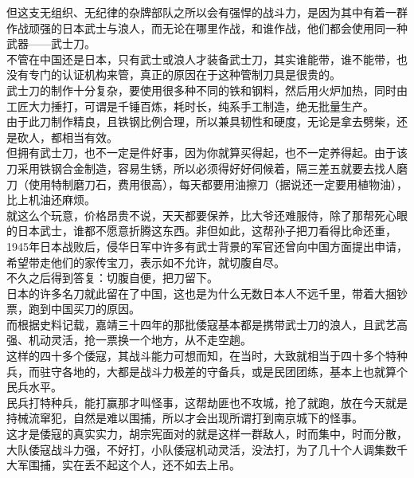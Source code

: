 \begin{multicols}{\theparacolNo}
但这支无组织、无纪律的杂牌部队之所以会有强悍的战斗力，是因为其中有着一群作战顽强的日本武士与浪人，而无论在哪里作战，和谁作战，他们都会使用同一种武器——武士刀。\\

不管在中国还是日本，只有武士或浪人才装备武士刀，其实谁能带，谁不能带，也没有专门的认证机构来管，真正的原因在于这种管制刀具是很贵的。\\

武士刀的制作十分复杂，要使用很多种不同的铁和钢料，然后用火炉加热，同时由工匠大力捶打，可谓是千锤百炼，耗时长，纯系手工制造，绝无批量生产。\\

由于此刀制作精良，且铁钢比例合理，所以兼具韧性和硬度，无论是拿去劈柴，还是砍人，都相当有效。\\

但拥有武士刀，也不一定是件好事，因为你就算买得起，也不一定养得起。由于该刀采用铁钢合金制造，容易生锈，所以必须得好好伺候着，隔三差五就要去找人磨刀（使用特制磨刀石，费用很高），每天都要用油擦刀（据说还一定要用植物油），比上机油还麻烦。\\

就这么个玩意，价格昂贵不说，天天都要保养，比大爷还难服侍，除了那帮死心眼的日本武士，谁都不愿意折腾这东西。非但如此，这帮孙子把刀看得比命还重，1945年日本战败后，侵华日军中许多有武士背景的军官还曾向中国方面提出申请，希望带走他们的家传宝刀，表示如不允许，就切腹自尽。\\

不久之后得到答复：切腹自便，把刀留下。\\

日本的许多名刀就此留在了中国，这也是为什么无数日本人不远千里，带着大捆钞票，跑到中国买刀的原因。\\

而根据史料记载，嘉靖三十四年的那批倭寇基本都是携带武士刀的浪人，且武艺高强、机动灵活，抢一票换一个地方，从不走空趟。\\

这样的四十多个倭寇，其战斗能力可想而知，在当时，大致就相当于四十多个特种兵，而驻守各地的，大都是战斗力极差的守备兵，或是民团团练，基本上也就算个民兵水平。\\

民兵打特种兵，能打赢那才叫怪事，这帮劫匪也不攻城，抢了就跑，放在今天就是持械流窜犯，自然是难以围捕，所以才会出现所谓打到南京城下的怪事。\\

这才是倭寇的真实实力，胡宗宪面对的就是这样一群敌人，时而集中，时而分散，大队倭寇战斗力强，不好打，小队倭寇机动灵活，没法打，为了几十个人调集数千大军围捕，实在丢不起这个人，还不如去上吊。\\


\end{multicols}
